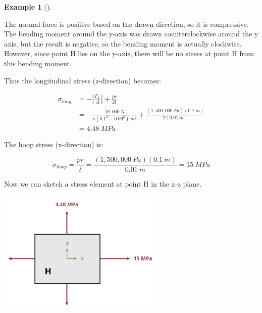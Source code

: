 \documentclass[
  letterpaper,
  DIV=11,
  numbers=noendperiod]{scrreprt}
\theoremstyle{definition}
\newtheorem{example}{Example}[chapter]
\theoremstyle{remark}
\begin{document}
\begin{tcolorbox}
\begin{example}[]
\begin{tcolorbox}
The normal force is positive based on the drawn direction, so it is
compressive. The bending moment around the y-axis was drawn
counterclockwise around the y axis, but the result is negative, so the
bending moment is actually clockwise. However, since point H lies on the
y-axis, there will be no stress at point H from this bending moment.~

Thus the longitudinal stress (z-direction) becomes:

\[
\begin{aligned}
\sigma_{long}&=-\left|\frac{F_L}{A}\right|+\frac{pr}{2t} \\
&=-\frac{18,000{~N}}{\pi\left(0.1^2-0.09^2\right){~m^2}}+\frac{(1,500,000{~Pa})(0.1{~m})}{2(0.01{~m})} \\
&=4.48{~MPa}
\end{aligned}
\]

The hoop stress (x-direction) is:

\[
\sigma_{hoop}=\frac{pr}{t}=\frac{(1,500,000{~Pa})(0.1{~m})}{0.01{~m}}=15{~MPa}
\]

Now we can sketch a stress element at point H in the x-z plane.

\begin{center}
\includegraphics[width=3.13542in,height=\textheight]{images/CH14 PNGs/example 14.4 part 3.png}
\end{center}

\end{tcolorbox}

\end{example}

\end{tcolorbox}
\end{document}

